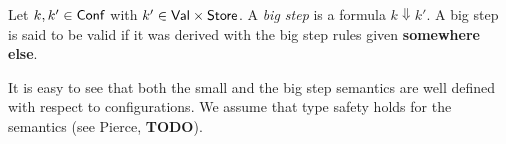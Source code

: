 \documentclass[12pt,a4paper]{report}
\newcommand{\Conf}{\sstyle{Conf}}
\newcommand{\scon}{\nstyle{con}}
\newcommand{\sexp}{\nstyle{exp}}
\newcommand{\ssto}{\nstyle{sto}}
\newcommand{\id}{\nstyle{id}}
\newcommand{\Fix}[1]{\nstyle{Fix}\,(#1)}
\begin{document}
\begin{definition}
  Let $k,k'\in\Conf$ with $k' \in \mathsf{Val} \times \mathsf{Store}$. A {\em big step} is a formula
  $k \Downarrow k'$. A big step is said to be valid if it was derived with the
  big step rules given {\bf somewhere else}.
\end{definition}

It is easy to see that both the small and the big step semantics are well defined
with respect to configurations. We assume that type safety holds for the semantics
(see Pierce, {\bf TODO}).


%
%
%
%
%
%
%
\end{document}
